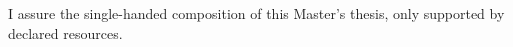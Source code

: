 
\clearemptydoublepage

\thispagestyle{empty}

\vspace*{0.8\textheight}
\noindent
I assure the single-handed composition of this Master's thesis, only supported by declared resources.

\vspace{15mm}
\noindent
\theplace \quad \thedate \hspace{4.5cm} \theauthor

\newpage
